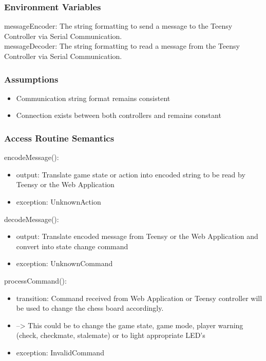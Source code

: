 \documentclass[12pt, titlepage]{article}
\begin{document}
\subsubsection{Environment Variables}{
  messageEncoder: The string formatting to send a message to the Teensy Controller via Serial Communication.\\
  messageDecoder: The string formatting to read a message from the Teensy Controller via Serial Communication.\\
}

\subsubsection{Assumptions}{
  \begin{itemize}
    \item Communication string format remains consistent
    \item Connection exists between both controllers and remains constant
  \end{itemize}
  
}

\subsubsection{Access Routine Semantics}

\noindent encodeMessage():
\begin{itemize}
\item output: Translate game state or action into encoded string to be read by Teensy or the Web Application
\item exception: UnknownAction
\end{itemize}

\noindent decodeMessage():
\begin{itemize}
\item output: Translate encoded message from Teensy or the Web Application and convert into state change command
\item exception: UnknownCommand
\end{itemize}

\noindent processCommand():
\begin{itemize}
\item transition: Command received from Web Application or Teensy controller will be used to change the chess board accordingly.
\item --> This could be to change the game state, game mode, player warning (check, checkmate, stalemate) or to light appropriate LED's
\item exception: InvalidCommand
\end{itemize}
\end{document}
